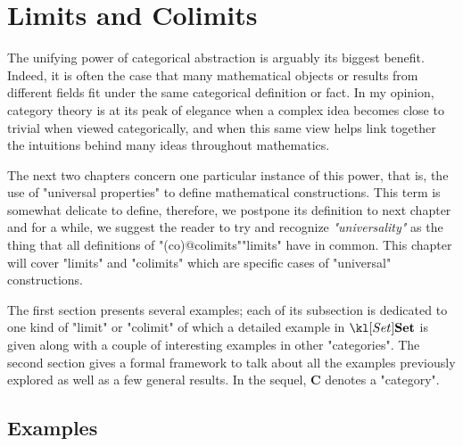 \documentclass[main.tex]{subfiles}
\begin{document}
\chapter{Limits and Colimits}\label{chap:limits}
The unifying power of categorical abstraction is arguably its biggest benefit. Indeed, it is often the case that many mathematical objects or results from different fields fit under the same categorical definition or fact. In my opinion, category theory is at its peak of elegance when a complex idea becomes close to trivial when viewed categorically, and when this same view helps link together the intuitions behind many ideas throughout mathematics.

The next two chapters concern one particular instance of this power, that is, the use of "universal properties" to define mathematical constructions. This term is somewhat delicate to define, therefore, we postpone its definition to next chapter and for a while, we suggest the reader to try and recognize \textit{"universality"} as the thing that all definitions of "(co)@colimits""limits" have in common. This chapter will cover "limits" and "colimits" which are specific cases of "universal" constructions.

The first section presents several examples; each of its subsection is dedicated to one kind of "limit" or "colimit" of which a detailed example in $\catSet$ is given along with a couple of interesting examples in other "categories". The second section gives a formal framework to talk about all the examples previously explored as well as a few general results. In the sequel, $\mathbf{C}$ denotes a "category".

\section{Examples}
\end{document}
